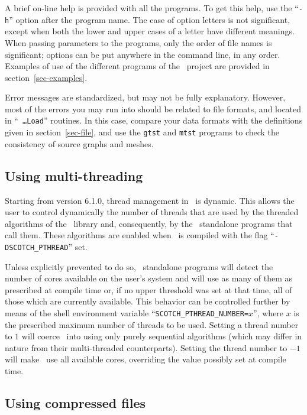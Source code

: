 A brief on-line help is provided with all the programs. To get this help,
use the ``\texttt{-h}'' option after the program name.
The case of option letters is not significant, except when
both the lower and upper cases of a letter have different meanings.
When passing parameters to the programs, only the order of file names is
significant; options can be put anywhere in the command line, in any order.
Examples of use of the different programs of the \scotch\ project are provided
in section~\ref{sec-examples}.

Error messages are standardized, but may not be fully explanatory.
However, most of the errors you may run into should be related to file
formats, and located in ``\mbox{\texttt{ \ldots Load}}'' routines.
In this case, compare your data formats with the definitions
given in section~\ref{sec-file}, and use the \texttt{gtst} and \texttt{mtst}
programs to check the consistency of source graphs and meshes.

\subsection{Using multi-threading}
\label{sec-prog-multithread}

Starting from version \textsc{6.1.0}, thread management in \scotch\ is
dynamic. This allows the user to control dynamically the number of
threads that are used by the threaded algorithms of the
\libscotch\ library and, consequently, by the \scotch\ standalone
programs that call them. These algorithms are enabled when \scotch\ is
compiled with the flag ``\texttt{-DSCOTCH\_\lbt PTHREAD}'' set.

Unless explicitly prevented to do so, \scotch\ standalone programs
will detect the number of cores available on the user's system and
will use as many of them as prescribed at compile time or, if no upper
threshold was set at that time, all of those which are currently
available. This behavior can be controlled further by means of the
shell environment variable
``\texttt{SCOTCH\_\lbt PTHREAD\_\lbt NUMBER=}$x$'', where $x$ is the
prescribed maximum number of threads to be used. Setting a thread
number to $1$ will coerce \scotch\ into using only purely sequential
algorithms (which may differ in nature from their multi-threaded
counterparts). Setting the thread number to $-1$ will make
\scotch\ use all available cores, overriding the value possibly set at
compile time.

\subsection{Using compressed files}
\label{sec-prog-compressed}

